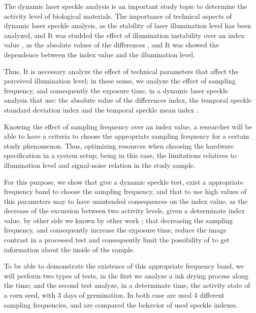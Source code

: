 \documentclass[review]{elsarticle}
\begin{document}
The dynamic laser speckle analysis is  an important
study topic\cite{catalano2019viability,rivera2019sound,gonzalez2018diode,Silva2018,braga2017dynamic} 
to determine the  activity level of biological materials. 
The importance of technical aspects of dynamic laser speckle analysis,
as the stability of laser illumination level has been  analyzed, 
and It was studded the effect of illumination instability over an index value \cite{gonzalez2018diode},
as the absolute values of the differences \cite{cardoso2014,rivera2017selection}, and
It  was showed the dependence between the index value and the illumination level. 

Thus, 
It is necessary analyze the effect of technical parameters that affect the perceived illumination level; 
in these sense,
we analyze the effect of sampling frequency, 
and consequently the exposure time, in a dynamic laser speckle analysis
that use: the absolute value of the differences index, 
the temporal speckle standard deviation index and the temporal speckle mean index \cite{Nothdurft:05}. 

Knowing the effect of sampling frequency over an index value,
a researcher will be able to have a criteria to choose the appropriate sampling frequency 
for a certain study phenomenon. Thus,
 optimizing resources when choosing the hardware specification in a system setup; 
being in this case, the limitations relatives to illumination level and signal-noise relation in the study sample.

For this purpose, we show that give a dynamic speckle test, exist a appropriate frequency band
to choose the sampling frequency, and that to use high values of this parameters
may to have unintended consequences on the index value, 
as the decrease of the excursion between two activity levels, given a determinate index value. 
by other side we known by other work \cite{Nothdurft:05}; 
that decreasing the sampling frequency, and consequently increase the exposure time,
reduce the image contrast in a processed test and consequently limit the possibility
of to get information about the inside of the sample.  

To be able to demonstrate the existence of this appropriate frequency band,
we will perform two types of tests, in the first we analyze a  ink drying process along the time; and
the second test analyze, in a determinate time, the activity state of a corn seed, with 3 days of germination.
In both case are used 4 different sampling frequencies, 
and are compared the behavior of used speckle indexes. 
\end{document}
